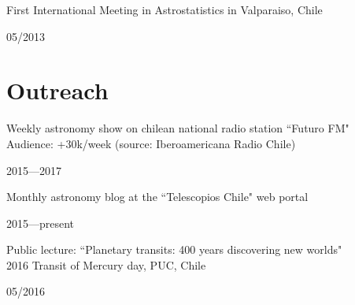 \documentclass[11pt, a4paper]{article} %
\begin{document}
\begin{minipage}[t]{0.7\textwidth}
\begin{flushleft}%
  \setlength{\leftskip}{0.2cm}%
First International Meeting in Astrostatistics in Valparaiso, Chile 
\end{flushleft}
\end{minipage}
\begin{minipage}[t]{0.3\textwidth}
\hfill 05/2013
\end{minipage}

\section*{Outreach}

\begin{minipage}[t]{0.7\textwidth}
\begin{flushleft}%
  \setlength{\leftskip}{0.2cm}%
Weekly astronomy show on chilean national radio station ``Futuro FM"\\
Audience: +30k/week (source: Iberoamericana Radio Chile) 
\end{flushleft}
\end{minipage}
\begin{minipage}[t]{0.3\textwidth}
\hfill 2015---2017
\end{minipage}

\vspace{0.3 cm}

\begin{minipage}[t]{0.7\textwidth}
\begin{flushleft}%
  \setlength{\leftskip}{0.2cm}%
Monthly astronomy blog at the ``Telescopios Chile" web portal
\end{flushleft}
\end{minipage}
\begin{minipage}[t]{0.3\textwidth}
\hfill 2015---present
\end{minipage}

\vspace{0.3 cm}

\begin{minipage}[t]{0.7\textwidth}
\begin{flushleft}%
  \setlength{\leftskip}{0.2cm}%
Public lecture: ``Planetary transits: 400 years discovering new worlds"\\
2016 Transit of Mercury day, PUC, Chile
\end{flushleft}
\end{minipage}
\begin{minipage}[t]{0.3\textwidth}
\hfill 05/2016
\end{minipage}
\end{document}
